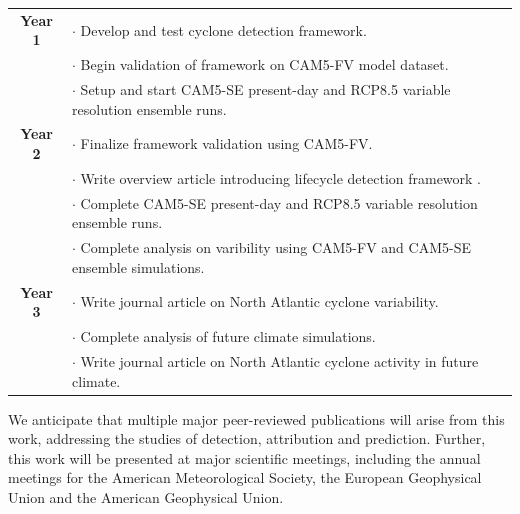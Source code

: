 \documentclass[11pt]{article}
\begin{document}
\begin{tabularx}{\textwidth}{cX}
\hline
\textbf{Year 1} & $\cdot$ Develop and test cyclone detection framework. \\
& $\cdot$ Begin validation of framework on CAM5-FV model dataset.  \\
& $\cdot$ Setup and start CAM5-SE present-day and RCP8.5 variable resolution ensemble runs. \\
\hline
\textbf{Year 2} & $\cdot$ Finalize framework validation using CAM5-FV. \\
& $\cdot$ Write overview article introducing lifecycle detection framework .\\
& $\cdot$ Complete CAM5-SE present-day and RCP8.5 variable resolution ensemble runs. \\
& $\cdot$ Complete analysis on varibility using CAM5-FV and CAM5-SE ensemble simulations. \\
\hline
\textbf{Year 3} & $\cdot$ Write journal article on North Atlantic cyclone variability. \\
& $\cdot$ Complete analysis of future climate simulations. \\
& $\cdot$ Write journal article on North Atlantic cyclone activity in future climate. \\
\hline
\end{tabularx}

We anticipate that multiple major peer-reviewed publications will arise from this work, addressing the studies of detection, attribution and prediction. Further, this work will be presented at major scientific meetings, including the annual meetings for the American Meteorological Society, the European Geophysical Union and the American Geophysical Union.

{\vbox{}}

\end{document}

